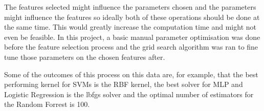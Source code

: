 The features selected might influence the parameters chosen and the parameters might influence the features so ideally both of these operations should be done at the same time. This would greatly increase the computation time and might not even be feasible. In this project, a basic manual parameter optimisation was done before the feature selection process and the grid search algorithm was ran to fine tune those parameters on the chosen features after.

Some of the outcomes of this process on this data are, for example, that the best performing kernel for SVMs is the RBF kernel, the best solver for MLP and Logistic Regression is the lbfgs solver and the optimal number of estimators for the Random Forrest is 100.